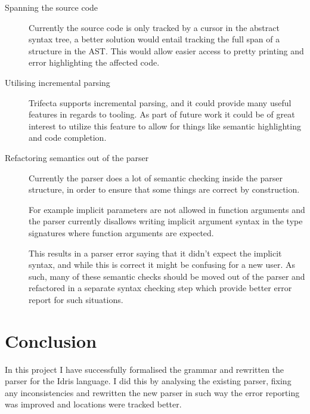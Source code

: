 \documentclass[a4paper]{article}%
\begin{document}
\begin{description}
  \item[Spanning the source code] Currently the source code is only tracked by a cursor in the abstract syntax tree,
        a better solution would entail tracking the full span of a structure in the AST. This would allow easier access to pretty printing and error highlighting the affected code.
  \item[Utilising incremental parsing] Trifecta supports incremental parsing, and it could provide many useful features in regards to tooling. As part of future work
                                       it could be of great interest to utilize this feature to allow for things like semantic highlighting and code completion.
  \item[Refactoring semantics out of the parser] Currently the parser does a lot of semantic checking inside the parser structure, in order to ensure
                                                 that some things are correct by construction.

                                                 For example implicit parameters are not allowed in function arguments
                                                 and the parser currently disallows writing implicit argument syntax in the type signatures where function arguments
                                                 are expected. 
                                                 
                                                 This results in a parser error saying that it didn't expect the implicit syntax, and while this is correct
                                                 it might be confusing for a new user. As such, many of these semantic checks should be moved out of the parser and
                                                 refactored in a separate syntax checking step which provide better error report for such situations.
\end{description}

\section{Conclusion}
\label{sec:Conclusion}
In this project I have successfully formalised the grammar and rewritten the parser for the Idris language.
I did this by analysing the existing parser, fixing any inconsistencies and rewritten the new parser in such way the error reporting was improved and locations were tracked better.
\end{document}
